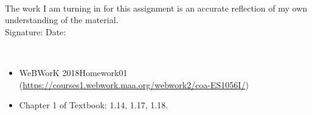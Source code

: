 \documentclass[11pt]{article}
\begin{document}
\\

\bigskip
\bigskip
\bigskip
\bigskip
\noindent The work I am turning in for this assignment is an accurate
reflection of my own understanding of the material.\\[14pt]

\noindent Signature: \underline{\hspace{7cm}} \hspace{1cm} Date:
\underline{\hspace{5cm}} 


\hspace{2mm}\\

\begin{itemize}
\setlength{\itemsep}{-1mm}
  \item WeBWorK 2018Homework01 (\url{https://courses1.webwork.maa.org/webwork2/coa-ES1056I/}) 
  \item Chapter 1 of Textbook: 1.14, 1.17, 1.18. %
\end{itemize}
\end{document}
